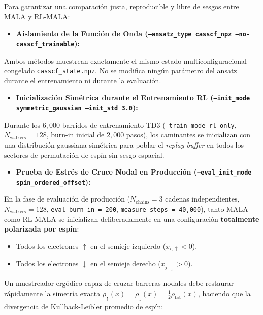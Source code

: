 \documentclass[10pt,a4paper]{article}
\begin{document}
Para garantizar una comparación justa, reproducible y libre de sesgos entre MALA y RL-MALA:



\begin{itemize}
\item \textbf{Aislamiento de la Función de Onda (\texttt{--ansatz\_type casscf\_npz --no-casscf\_trainable}):}
\end{itemize}

   Ambos métodos muestrean exactamente el mismo estado multiconfiguracional congelado \texttt{casscf\_state.npz}. No se modifica ningún parámetro del ansatz durante el entrenamiento ni durante la evaluación.

\begin{itemize}
\item \textbf{Inicialización Simétrica durante el Entrenamiento RL (\texttt{--init\_mode symmetric\_gaussian --init\_std 3.0}):}
\end{itemize}

   Durante los $6,000$ barridos de entrenamiento TD3 (\texttt{--train\_mode rl\_only}, $N_{\mathrm{walkers}}=128$, burn-in inicial de $2,000$ pasos), los caminantes se inicializan con una distribución gaussiana simétrica para poblar el \textit{replay buffer} en todos los sectores de permutación de espín sin sesgo espacial.

\begin{itemize}
\item \textbf{Prueba de Estrés de Cruce Nodal en Producción (\texttt{--eval\_init\_mode spin\_ordered\_offset}):}
\end{itemize}

   En la fase de evaluación de producción ($N_{\mathrm{chains}}=3$ cadenas independientes, $N_{\mathrm{walkers}}=128$, \texttt{eval\_burn\_in = 200}, \texttt{measure\_steps = 40,000}), tanto MALA como RL-MALA se inicializan deliberadamente en una configuración \textbf{totalmente polarizada por espín}:

\begin{itemize}
\item Todos los electrones $\uparrow$ en el semieje izquierdo ($x_{i,\uparrow} < 0$).
\item Todos los electrones $\downarrow$ en el semieje derecho ($x_{j,\downarrow} > 0$).
\end{itemize}

   Un muestreador ergódico capaz de cruzar barreras nodales debe restaurar rápidamente la simetría exacta $\rho_\uparrow(x) = \rho_\downarrow(x) = \frac{1}{2}\rho_{\mathrm{tot}}(x)$, haciendo que la divergencia de Kullback-Leibler promedio de espín:
\end{document}
